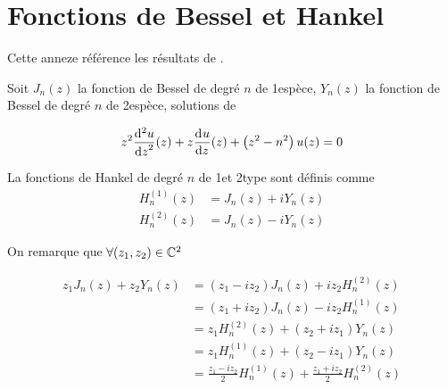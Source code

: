 \section{Fonctions de Bessel et Hankel}

Cette anneze référence les résultats de \cite{abramowitz_handbook_1964}.

Soit $J_n(z)$ la fonction de Bessel de degré $n$ de 1\iere espèce, $Y_n(z)$ la fonction de Bessel de degré $n$ de 2\ieme espèce, solutions de

\begin{equation}
    z^2 \ddp[2]{z}{u}(z) + z\ddp{z}{u}(z)+\left(z^2-n^2\right)u(z) = 0
\end{equation}

La fonctions de Hankel de degré $n$ de 1\iere et 2\ieme type sont définis comme
\begin{align}
    H_n^{(1)}(z) &= J_n(z) + iY_n(z)\\
    H_n^{(2)}(z) &= J_n(z) - iY_n(z)
\end{align}

On remarque que $\forall (z_1,z_2) \in \CC^2$

\begin{equation}
\begin{aligned}
z_1 J_n(z) + z_2 Y_n(z) 
&= ( z_1 - i z_2 ) J_n(z) + iz_2 H_n^{(2)}(z) \\
&= ( z_1 + i z_2 ) J_n(z) - iz_2 H_n^{(1)}(z) \\
&= z_1 H_n^{(2)}(z) + ( z_2 + i z_1 ) Y_n(z) \\
&= z_1 H_n^{(1)}(z) + ( z_2 - i z_1 ) Y_n(z) \\
&= \frac{z_1-iz_2}{2}H_n^{(1)}(z) + \frac{z_1+iz_2}{2}H_n^{(2)}(z)
\end{aligned}
\label{eq:annex:bessel:equiv_bessel}
\end{equation}